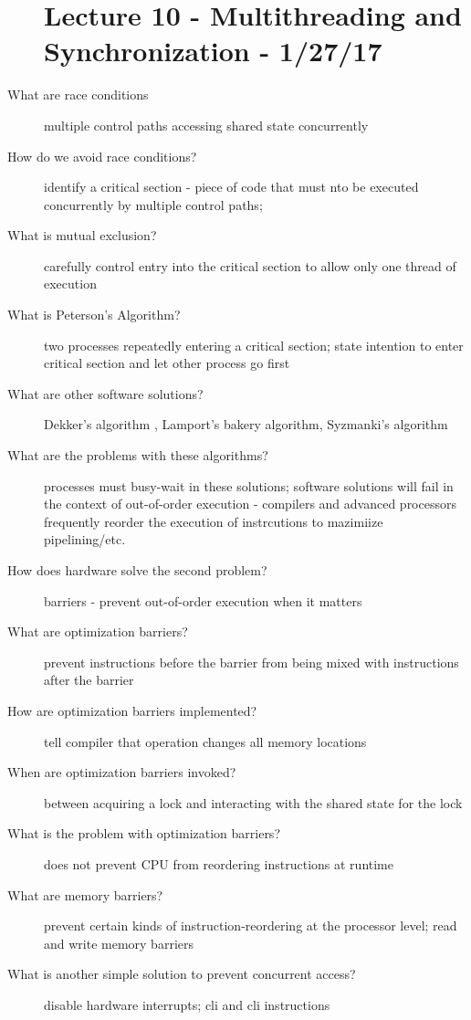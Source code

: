 \documentclass[10pt]{article}
\begin{document}
\begin{description}
\section{Lecture 10 - Multithreading and Synchronization - 1/27/17}
\item[What are race conditions]
  multiple control paths accessing shared state concurrently
\item[How do we avoid race conditions?]
  identify a critical section - piece of code that must nto be executed concurrently by multiple control paths;
\item[What is mutual exclusion?]
  carefully control entry into the critical section to allow only one thread of execution
\item[What is Peterson's Algorithm?]
  two processes repeatedly entering a critical section;
  state intention to enter critical section and let other process go first
\item[What are other software solutions?]
  Dekker's algorithm , Lamport's bakery algorithm, Syzmanki's algorithm
\item[What are the problems with these algorithms?]
  processes must busy-wait in these solutions;
  software solutions will fail in the context of out-of-order execution - compilers and advanced processors frequently reorder the execution of instrcutions to mazimiize pipelining/etc.
\item[How does hardware solve the second problem?]
  barriers - prevent out-of-order execution when it matters
\item[What are optimization barriers?]
  prevent instructions before the barrier from being mixed with instructions after the barrier
\item[How are optimization barriers implemented?]
  tell compiler that operation changes all memory locations
\item[When are optimization barriers invoked?]
  between acquiring a lock and interacting with the shared state for the lock
\item[What is the problem with optimization barriers?]
  does not prevent CPU from reordering instructions at runtime
\item[What are memory barriers?]
  prevent certain kinds of instruction-reordering at the processor level;
  read and write memory barriers
\item[What is another simple solution to prevent concurrent access?]
  disable hardware interrupts; cli and cli instructions

\end{description}
\end{document}
